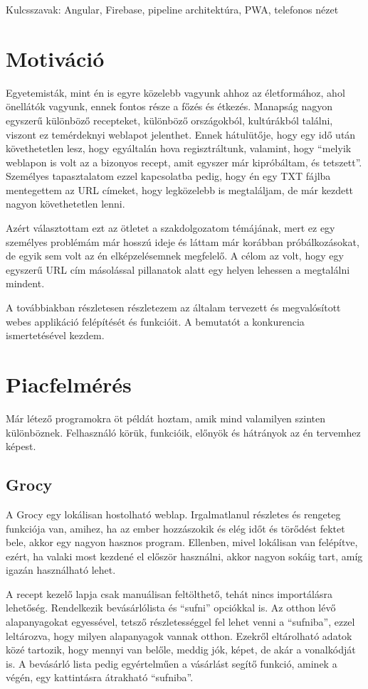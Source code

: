 \documentclass[12pt]{report}
\theoremstyle{definition}
\begin{document}
Kulcsszavak: Angular, Firebase, pipeline architektúra, PWA, telefonos nézet

\chapter*{Motiváció}

Egyetemisták, mint én is egyre közelebb vagyunk ahhoz az életformához, ahol önellátók vagyunk, ennek fontos része a főzés és étkezés. Manapság nagyon egyszerű különböző recepteket, különböző országokból, kultúrákból találni, viszont ez temérdeknyi weblapot jelenthet. Ennek hátulütője, hogy egy idő után követhetetlen lesz, hogy egyáltalán hova regisztráltunk, valamint, hogy “melyik weblapon is volt az a bizonyos recept, amit egyszer már kipróbáltam, és tetszett”. Személyes tapasztalatom ezzel kapcsolatba pedig, hogy én egy TXT fájlba mentegettem az URL címeket, hogy legközelebb is megtaláljam, de már kezdett nagyon követhetetlen lenni.

Azért választottam ezt az ötletet a szakdolgozatom témájának, mert ez egy személyes problémám már hosszú ideje és láttam már korábban próbálkozásokat, de egyik sem volt az én elképzelésemnek megfelelő. A célom az volt, hogy egy egyszerű URL cím másolással pillanatok alatt egy helyen lehessen a megtalálni mindent.

A továbbiakban részletesen részletezem az általam tervezett és megvalósított webes applikáció felépítését és funkcióit. A bemutatót a konkurencia ismertetésével kezdem.


\chapter{Piacfelmérés}
Már létező programokra öt példát hoztam, amik mind valamilyen szinten különböznek.
Felhasználó körük, funkcióik, előnyök és hátrányok az én tervemhez képest.

\section{Grocy}
A Grocy egy lokálisan hostolható weblap. Irgalmatlanul részletes és rengeteg funkciója van, amihez, ha az ember hozzászokik és elég időt és törődést fektet bele, akkor egy nagyon hasznos program. Ellenben, mivel lokálisan van felépítve, ezért, ha valaki most kezdené el először használni, akkor nagyon sokáig tart, amíg igazán használható lehet.

A recept kezelő lapja csak manuálisan feltölthető, tehát nincs importálásra lehetőség. Rendelkezik bevásárlólista és “sufni” opciókkal is. Az otthon lévő alapanyagokat egyessével, tetsző részletességgel fel lehet venni a “sufniba”, ezzel leltározva, hogy milyen alapanyagok vannak otthon. Ezekről eltárolható adatok közé tartozik, hogy mennyi van belőle, meddig jók, képet, de akár a vonalkódját is. A bevásárló lista pedig egyértelműen a vásárlást segítő funkció, aminek a végén, egy kattintásra átrakható “sufniba”.
\end{document}

